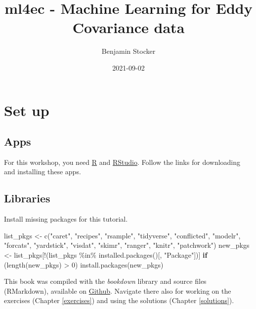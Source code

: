 \documentclass[
]{book}
\title{ml4ec - Machine Learning for Eddy Covariance data}
\author{Benjamin Stocker}
\date{2021-09-02}
\newenvironment{Shaded}{\begin{snugshade}}{\end{snugshade}}
\newcommand{\ControlFlowTok}[1]{\textcolor[rgb]{0.13,0.29,0.53}{\textbf{#1}}}
\newcommand{\DecValTok}[1]{\textcolor[rgb]{0.00,0.00,0.81}{#1}}
\newcommand{\FunctionTok}[1]{\textcolor[rgb]{0.00,0.00,0.00}{#1}}
\newcommand{\NormalTok}[1]{#1}
\newcommand{\OtherTok}[1]{\textcolor[rgb]{0.56,0.35,0.01}{#1}}
\newcommand{\SpecialCharTok}[1]{\textcolor[rgb]{0.00,0.00,0.00}{#1}}
\newcommand{\StringTok}[1]{\textcolor[rgb]{0.31,0.60,0.02}{#1}}
\begin{document}
\maketitle

{
\setcounter{tocdepth}{1}
\tableofcontents
}
\hypertarget{set-up}{%
\chapter{Set up}\label{set-up}}

\hypertarget{apps}{%
\section{Apps}\label{apps}}

For this workshop, you need \href{https://www.r-project.org/}{R} and \href{https://www.rstudio.com/products/rstudio/download/}{RStudio}. Follow the links for downloading and installing these apps.

\hypertarget{libraries}{%
\section{Libraries}\label{libraries}}

Install missing packages for this tutorial.

\begin{Shaded}
\begin{Highlighting}[]
\NormalTok{list\_pkgs }\OtherTok{\textless{}{-}} \FunctionTok{c}\NormalTok{(}\StringTok{"caret"}\NormalTok{, }\StringTok{"recipes"}\NormalTok{, }\StringTok{"rsample"}\NormalTok{, }\StringTok{"tidyverse"}\NormalTok{, }\StringTok{"conflicted"}\NormalTok{, }\StringTok{"modelr"}\NormalTok{, }\StringTok{"forcats"}\NormalTok{, }\StringTok{"yardstick"}\NormalTok{, }\StringTok{"visdat"}\NormalTok{, }\StringTok{"skimr"}\NormalTok{, }\StringTok{"ranger"}\NormalTok{, }\StringTok{"knitr"}\NormalTok{, }\StringTok{"patchwork"}\NormalTok{)}
\NormalTok{new\_pkgs }\OtherTok{\textless{}{-}}\NormalTok{ list\_pkgs[}\SpecialCharTok{!}\NormalTok{(list\_pkgs }\SpecialCharTok{\%in\%} \FunctionTok{installed.packages}\NormalTok{()[, }\StringTok{"Package"}\NormalTok{])]}
\ControlFlowTok{if}\NormalTok{ (}\FunctionTok{length}\NormalTok{(new\_pkgs) }\SpecialCharTok{\textgreater{}} \DecValTok{0}\NormalTok{) }\FunctionTok{install.packages}\NormalTok{(new\_pkgs)}
\end{Highlighting}
\end{Shaded}

This book was compiled with the \emph{bookdown} library and source files (RMarkdown), available on \href{https://github.com/stineb/ml4ec_workshop}{Github}. Navigate there also for working on the exercises (Chapter \ref{exercises}) and using the solutions (Chapter \ref{solutions}).
\end{document}
